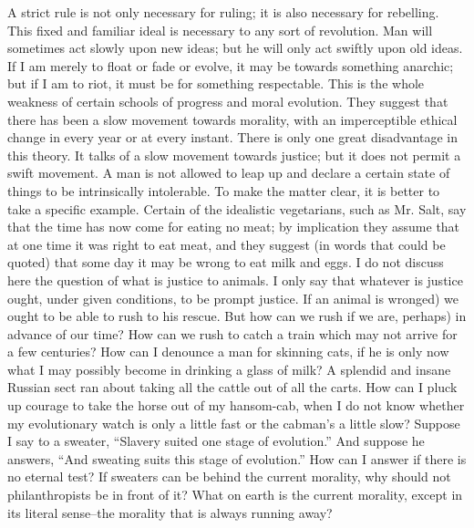 \documentclass{book}
\begin{document}
A strict rule is not only necessary for ruling; it is also necessary for rebelling. This fixed and familiar ideal is necessary to any sort of revolution. Man will sometimes act slowly upon new ideas; but he will only act swiftly upon old ideas. If I am merely to float or fade or evolve, it may be towards something anarchic; but if I am to riot, it must be for something respectable. This is the whole weakness of certain schools of progress and moral evolution. They suggest that there has been a slow movement towards morality, with an imperceptible ethical change in every year or at every instant. There is only one great disadvantage in this theory. It talks of a slow movement towards justice; but it does not permit a swift movement. A man is not allowed to leap up and declare a certain state of things to be intrinsically intolerable. To make the matter clear, it is better to take a specific example. Certain of the idealistic vegetarians, such as Mr. Salt, say that the time has now come for eating no meat; by implication they assume that at one time it was right to eat meat, and they suggest (in words that could be quoted) that some day it may be wrong to eat milk and eggs. I do not discuss here the question of what is justice to animals. I only say that whatever is justice ought, under given conditions, to be prompt justice. If an animal is wronged) we ought to be able to rush to his rescue. But how can we rush if we are, perhaps) in advance of our time? How can we rush to catch a train which may not arrive for a few centuries? How can I denounce a man for skinning cats, if he is only now what I may possibly become in drinking a glass of milk? A splendid and insane Russian sect ran about taking all the cattle out of all the carts. How can I pluck up courage to take the horse out of my hansom-cab, when I do not know whether my evolutionary watch is only a little fast or the cabman’s a little slow? Suppose I say to a sweater, “Slavery suited one stage of evolution.” And suppose he answers, “And sweating suits this stage of evolution.” How can I answer if there is no eternal test? If sweaters can be behind the current morality, why should not philanthropists be in front of it? What on earth is the current morality, except in its literal sense–the morality that is always running away?
\end{document}
